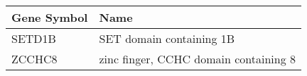 \begin{tabular}{ll}
\toprule
Gene Symbol &                                  Name \\
\midrule
     SETD1B &              SET domain containing 1B \\
     ZCCHC8 & zinc finger, CCHC domain containing 8 \\
\bottomrule
\end{tabular}
